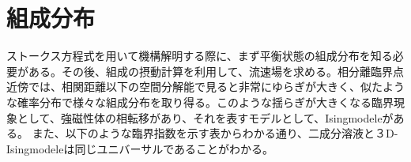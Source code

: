 \documentclass[a4paper,12pt, oneside, openany]{jsbook}
\begin{document}









\newpage



\section{組成分布}

ストークス方程式を用いて機構解明する際に、まず平衡状態の組成分布を知る必要がある。その後、組成の摂動計算を利用して、流速場を求める。相分離臨界点近傍では、相関距離以下の空間分解能で見ると非常にゆらぎが大きく、似たような確率分布で様々な組成分布を取り得る。このような揺らぎが大きくなる臨界現象として、強磁性体の相転移があり、それを表すモデルとして、Isingmodeleがある。
また、以下のような臨界指数を示す表からわかる通り、二成分溶液と３D-Isingmodeleは同じユニバーサルであることがわかる。
\end{document}
